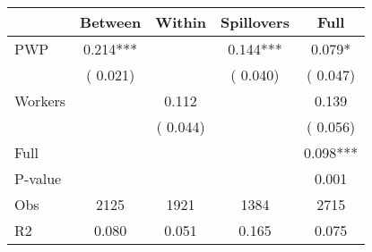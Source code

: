 
\begin{tabular}{l*{4}{c}}\hline&\multicolumn{1}{c}{Between}&\multicolumn{1}{c}{Within}&\multicolumn{1}{c}{Spillovers}&\multicolumn{1}{c}{Full}\\ \hline
 PWP           &              0.214***      &                                               &        0.144*** &         0.079*                            \\ 
                               &        (       0.021)           &                                       &       (       0.040)     &      (       0.047)                                           \\ 
 Workers       &                                               &        0.112    &                                &             0.139                            \\ 
                               &                                               & (       0.044)                  &                                        &      (       0.056)                                           \\ 
\hline                                                                                                                                                                                                                                            
 Full                  &                                               &                                               &                                        &             0.098***                                     \\ 
 P-value               &                                               &                                               &                                        &             0.001                                           \\ 
 Obs                   &               2125               &       1921                       &       1384                &              2715                                               \\ 
 R2                    &                      0.080              &              0.051                      &              0.165               &                     0.075                                              \\ 
\hline \end{tabular}                                                                                                                                                                                                              
